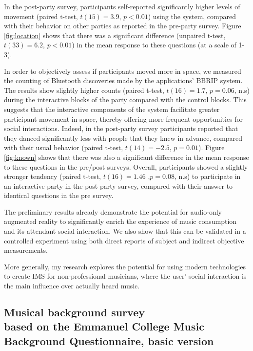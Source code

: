 \documentclass[a4paper,11pt]{article}
\begin{document}
{In the post-party survey, participants self-reported significantly higher levels of movement (paired t-test, $t(15)=3.9$, $p<0.01$) using the system, compared with their behavior on other parties as reported in the pre-party survey.
Figure \ref{fig:location} shows that there was a significant difference (unpaired t-test, $t(33)=6.2$, $p<0.01$) in the mean response to these questions (at a scale of 1-3).

In order to objectively assess if participants moved more in space, we measured the counting of Bluetooth discoveries made by the applications' BBRIP system.
The results show slightly higher counts (paired t-test, $t(16)=1.7$, $p=0.06$, n.s) during the interactive blocks of the party compared with the control blocks. This suggests that the interactive components of the system facilitate greater participant movement in space, thereby offering more frequent opportunities for social interactions.
Indeed, in the post-party survey participants reported that they danced significantly less with people that they knew in advance, compared with their usual behavior (paired t-test, $t(14)=-2.5$, $p=0.01$).
Figure \ref{fig:known} shows that there was also a significant difference in the mean response to these questions in the pre/post surveys.
Overall, participants showed a slightly stronger tendency (paired t-test, $t(16)=1.46$ ,$p=0.08$, n.s) to participate in an interactive party in the post-party survey, compared with their answer to identical questions in the pre survey.

The preliminary results already demonstrate the potential for audio-only augmented reality to significantly enrich the experience of music consumption and its attendant social interaction.
We also show that this can be validated in a controlled experiment using both direct reports of subject and indirect objective measurements.

More generally, my research explores the potential for using modern technologies to create IMS for non-professional musicians, where the user' social interaction is the main influence over actually heard music.

\begin{appendices}

\section[Musical background survey]{Musical background survey\\
	{\normalsize based on the Emmanuel College Music Background Questionnaire, basic version}}


\end{appendices}}
\end{document}
